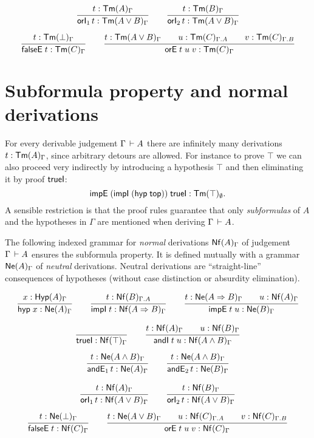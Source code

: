 \documentclass[a4paper]{article}
\begin{document}
\begin{gather*}
  \ru{t : \TmG A
    }{\orI1 t : \TmG {A \lor B}
    }
\qquad
  \ru{t : \TmG B
    }{\orI2 t : \TmG {A \lor B}
    }
\\[1ex]
  \ru{t : \TmG \bot
    }{\falseE t : \TmG C}
\qquad
  \ru{t : \TmG {A \lor B} \qquad
      u : \Tm[\Gamma.A]C  \qquad
      v : \Tm[\Gamma.B]C
    }{\orE t u v : \TmG C}
\end{gather*}

\section{Subformula property and normal derivations}

For every derivable judgement $\Gamma \der A$ there are infinitely
many derivations $t : \TmG A$, since arbitrary detours are allowed.
For instance to prove $\top$ we can also proceed very indirectly by
introducing a hypothesis $\top$ and then eliminating it by proof
$\trueI$:
\[\impEP{\impIP{\hyp{\ttop}}}{\trueI} : \Tm[\cempty]\top.\]
A sensible restriction is that the proof rules guarantee that only
\emph{subformulas} of $A$ and the hypotheses in $\Gamma$ are mentioned when
deriving $\Gamma \der A$.

The following indexed grammar for \emph{normal} derivations $\NfG A$ of
judgement $\Gamma \der A$ ensures the subformula property.  It is
defined mutually with a grammar $\NeG A$ of \emph{neutral} derivations.
Neutral derivations are ``straight-line'' consequences of hypotheses
(without case distinction or absurdity elimination).

\begin{gather*}
  \ru{x : \Hyp[\Gamma]A}{\hyp x : \NeG A}
\qquad
  \ru{t : \Nf[\Gamma.A]B}{\impI t : \NfG{A \imp B}}
\qquad
  \ru{t : \NeG{A \imp B} \qquad
      u : \NfG A
    }{\impE t u : \NeG B}
\end{gather*}

\begin{gather*}
  \ru{}{\trueI : \NfG\top}
\qquad
  \ru{t : \NfG A \qquad
      u : \NfG B
    }{\andI t u : \NfG{A \land B}
    }
\\[1ex]
  \ru{t : \NeG{A \land B}
    }{\andE1 t : \NeG A
    }
\qquad
  \ru{t : \NeG{A \land B}
    }{\andE2 t : \NeG B
    }
\end{gather*}

\begin{gather*}
  \ru{t : \NfG A
    }{\orI1 t : \NfG {A \lor B}
    }
\qquad
  \ru{t : \NfG B
    }{\orI2 t : \NfG {A \lor B}
    }
\\[1ex]
  \ru{t : \NeG \bot
    }{\falseE t : \NfG C}
\qquad
  \ru{t : \NeG {A \lor B} \qquad
      u : \Nf[\Gamma.A]C  \qquad
      v : \Nf[\Gamma.B]C
    }{\orE t u v : \NfG C}
\end{gather*}
\end{document}
